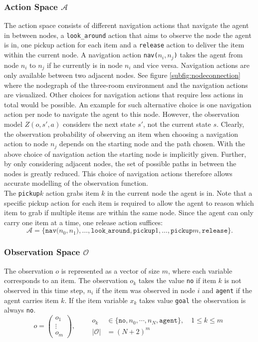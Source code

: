 \subsubsection{Action Space $\mathcal{A}$}
The action space consists of different navigation actions that navigate the agent in between nodes, a \texttt{look\_around} action that aims to observe the node the agent is in, one pickup action for each item and a \texttt{release} action to deliver the item within the current node. A navigation action \texttt{nav($n_i, n_j$)} takes the agent from node $n_i$ to $n_j$ if he currently is in node $n_i$ and vice versa. Navigation actions are only available between two adjacent nodes. See figure \ref{subfig:nodeconnection} where the nodegraph of the three-room environment and the navigation actions are visualized. Other choices for navigation actions that require less actions in total would be possible. An example for such alternative choice is one navigation action per node to navigate the agent to this node. However, the observation model $Z(o, s', a)$ considers the next state $s'$, not the current state $s$. Clearly, the observation probability of observing an item when choosing a navigation action to node $n_j$ depends on the starting node and the path chosen. With the above choice of navigation action the starting node is implicitly given. Further, by only considering adjacent nodes, the set of possible paths in between the nodes is greatly reduced. This choice of navigation actions therefore allows accurate modelling of the observation function.\\
The \texttt{pickup$k$} action grabs item $k$ in the current node the agent is in. Note that a specific pickup action for each item is required to allow the agent to reason which item to grab if multiple items are within the same node. Since the agent can only carry one item at a time, one release action suffices:
\begin{equation}
    \mathcal{A} = \{\texttt{nav($n_0, n_1$)}, \ldots, \texttt{look\_around}, \texttt{pickup$1$}, \ldots, \texttt{pickup$m$}, \texttt{release}\}.
\end{equation}
\subsubsection{Observation Space $\mathcal{O}$}
The observation $o$ is represented as a vector of size $m$, where each variable corresponds to an item. The observation $o_k$ takes the value \texttt{no} if item $k$ is not observed in this time step, $n_i$ if the item was observed in node $i$ and \texttt{agent} if the agent carries item $k$. If the item variable $x_k$ takes value \texttt{goal} the observation is always \texttt{no}.
\begin{equation}
    o = \begin{pmatrix} o_1 \\ \vdots \\ o_m \end{pmatrix}, \qquad \begin{aligned} o_k &\in \{ \texttt{no}, n_0, \cdots, n_N, \texttt{agent} \}, \quad 1 \leq k \leq m\\
    |\mathcal{O}|&= (N+2)^m \end{aligned}
\end{equation}

